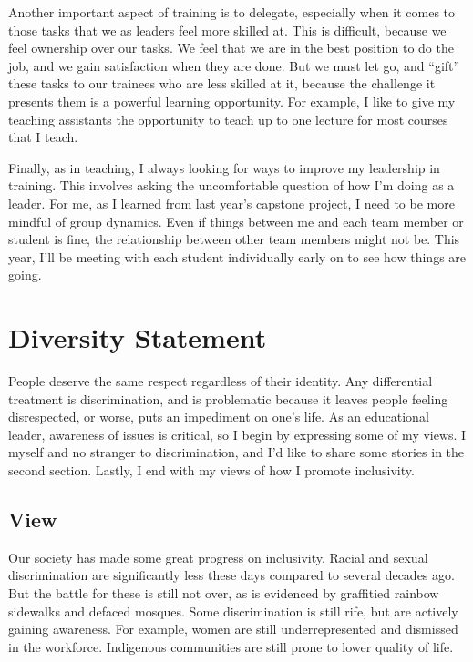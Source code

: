\documentclass[]{article}
\begin{document}
Another important aspect of training is to delegate, especially when it comes to those tasks that we as leaders feel more skilled at. This is difficult, because we feel ownership over our tasks. We feel that we are in the best position to do the job, and we gain satisfaction when they are done. But we must let go, and ``gift'' these tasks to our trainees who are less skilled at it, because the challenge it presents them is a powerful learning opportunity. For example, I like to give my teaching assistants the opportunity to teach up to one lecture for most courses that I teach.

Finally, as in teaching, I always looking for ways to improve my leadership in training. This involves asking the uncomfortable question of how I'm doing as a leader. For me, as I learned from last year's capstone project, I need to be more mindful of group dynamics. Even if things between me and each team member or student is fine, the relationship between other team members might not be. This year, I'll be meeting with each student individually early on to see how things are going.

\hypertarget{diversity-statement}{%
\section{Diversity Statement}\label{diversity-statement}}

People deserve the same respect regardless of their identity. Any differential treatment is discrimination, and is problematic because it leaves people feeling disrespected, or worse, puts an impediment on one's life. As an educational leader, awareness of issues is critical, so I begin by expressing some of my views. I myself and no stranger to discrimination, and I'd like to share some stories in the second section. Lastly, I end with my views of how I promote inclusivity.

\hypertarget{view}{%
\subsection{View}\label{view}}

Our society has made some great progress on inclusivity. Racial and sexual discrimination are significantly less these days compared to several decades ago. But the battle for these is still not over, as is evidenced by graffitied rainbow sidewalks and defaced mosques. Some discrimination is still rife, but are actively gaining awareness. For example, women are still underrepresented and dismissed in the workforce. Indigenous communities are still prone to lower quality of life.
\end{document}
